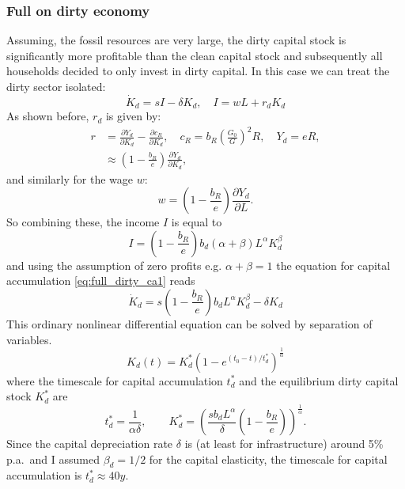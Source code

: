 \newpage



\subsubsection{Full on dirty economy}
\label{sec:full_dirty_economy}

Assuming, the fossil resources are very large, the dirty capital stock is significantly more profitable than the clean capital stock and subsequently all households decided to only invest in dirty capital. In this case we can treat the dirty sector isolated:
\begin{equation}
	\dot{K}_d = s I - \delta K_d, \quad I = w L + r_d K_d
	\label{eq:full_dirty_ca1}
\end{equation}
As shown before, $r_d$ is given by:
\begin{align}
	r &= \frac{\partial Y_d}{\partial K_d} - \frac{\partial c_R}{\partial K_d}, \quad c_R = b_R\left( \frac{G_0}{G} \right)^{2} R, \quad Y_d = eR, \\
	&\approx \left( 1-\frac{b_R}{e} \right)\frac{\partial Y_d}{\partial K_d},
	\label{eq:full_dirty_capital_rent}
\end{align}
and similarly for the wage $w$:
\begin{equation}
	w = \left( 1-\frac{b_R}{e} \right)\frac{\partial Y_d}{\partial L}.
	\label{eq:full_dirty_wage}
\end{equation}
So combining these, the income $I$ is equal to
\begin{equation}
	I = \left( 1-\frac{b_R}{e} \right)b_d (\alpha + \beta) L^{\alpha} K_d^{\beta}
	\label{eq_full_dirty_income}
\end{equation}
and using the assumption of zero profits e.g. $\alpha + \beta = 1$ the equation for capital accumulation \eqref{eq:full_dirty_ca1} reads
\begin{equation}
	\dot{K}_d = s\left( 1 - \frac{b_R}{e} \right) b_d L^{\alpha} K_d^{\beta} - \delta K_d
	\label{eq:full_dirty_ca2}
\end{equation}
This ordinary nonlinear differential equation can be solved by separation of variables.
\begin{equation}
  K_d (t) = K_d^{*} \left(1 - e^{(t_0-t)/t_d^{*}} \right)^{\frac{1}{\alpha}}
	\label{eq:dirty_capital_ac_solution}
\end{equation}
where the timescale for capital accumulation $t^*_d$ and the equilibrium dirty capital stock $K^*_d$ are
\begin{equation}
	t_d^{*} = \frac{1}{\alpha \delta}, \qquad K_d^{*} = \left( \frac{s b_d L^\alpha}{\delta}\left(1-\frac{b_R}{e}  \right) \right)^{\frac{1}{\alpha}}.
	\label{eq:full_dirty_capital_equilibrium_values}
\end{equation}
Since the capital depreciation rate $\delta$ is (at least for infrastructure) around 5\% p.a.\ and I assumed $\beta_d=1/2$ for the capital elasticity, the timescale for capital accumulation is $t^*_d \approx 40 y$.




